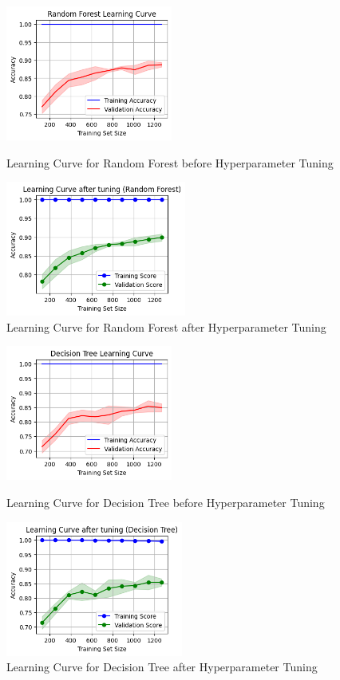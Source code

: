 \documentclass[12pt]{report}
\begin{document}
\begin{figure}[H]
	\centering
	\begin{minipage}{0.45\textwidth}
			\centering
			\includegraphics[height=12em]{lc_RF.png}
			\caption{Learning Curve for Random Forest before Hyperparameter Tuning}
			\label{lc_RF}
	\end{minipage}
	\hfill
	\begin{minipage}{0.45\textwidth}
			\centering
			\includegraphics[height=12em]{lc_tuned_RF.png}
			\caption{Learning Curve for Random Forest after Hyperparameter Tuning}
			\label{lc_tuned_RF}
	\end{minipage}
\end{figure}

\begin{figure}[H]
	\centering
	\begin{minipage}{0.45\textwidth}
			\centering
			\includegraphics[height=12em]{lc_DT.png}
			\caption{Learning Curve for Decision Tree before Hyperparameter Tuning}
			\label{lc_DT}
	\end{minipage}
	\hfill
	\begin{minipage}{0.45\textwidth}
			\centering
			\includegraphics[height=12em]{lc_tuned_DT.png}
			\caption{Learning Curve for Decision Tree after Hyperparameter Tuning}
			\label{lc_tuned_DT}
	\end{minipage}
\end{figure}
\end{document}

